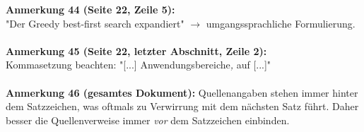 \documentclass[a4paper,12pt]{book}
\begin{document}
\noindent
\textbf{Anmerkung 44 (Seite 22, Zeile 5):}\\
"Der Greedy best-first search expandiert" $\rightarrow$ umgangssprachliche Formulierung. \\
\\

\noindent
\textbf{Anmerkung 45 (Seite 22, letzter Abschnitt, Zeile 2):}\\
Kommasetzung beachten: "[...] Anwendungsbereiche\emph{,} auf [...]" \\
\\

\noindent
\textbf{Anmerkung 46 (gesamtes Dokument):}
Quellenangaben stehen immer hinter dem Satzzeichen, was oftmals zu Verwirrung mit dem nächsten Satz führt. Daher besser die Quellenverweise immer \emph{vor} dem Satzzeichen einbinden. \\
\\
\end{document}
